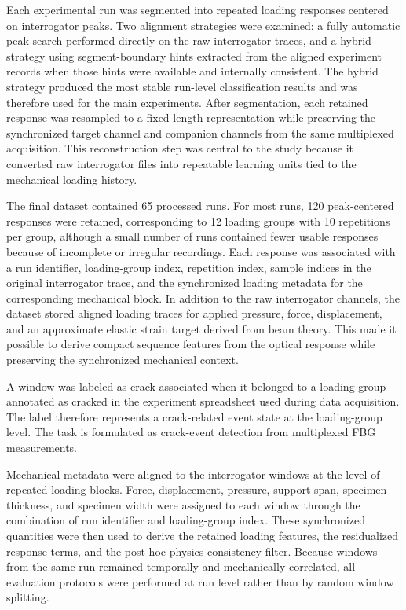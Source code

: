 \documentclass[fleqn,10pt]{wlscirep}
\begin{document}
Each experimental run was segmented into repeated loading responses centered on interrogator peaks. Two alignment strategies were examined: a fully automatic peak search performed directly on the raw interrogator traces, and a hybrid strategy using segment-boundary hints extracted from the aligned experiment records when those hints were available and internally consistent. The hybrid strategy produced the most stable run-level classification results and was therefore used for the main experiments. After segmentation, each retained response was resampled to a fixed-length representation while preserving the synchronized target channel and companion channels from the same multiplexed acquisition. This reconstruction step was central to the study because it converted raw interrogator files into repeatable learning units tied to the mechanical loading history.

The final dataset contained 65 processed runs. For most runs, 120 peak-centered responses were retained, corresponding to 12 loading groups with 10 repetitions per group, although a small number of runs contained fewer usable responses because of incomplete or irregular recordings. Each response was associated with a run identifier, loading-group index, repetition index, sample indices in the original interrogator trace, and the synchronized loading metadata for the corresponding mechanical block. In addition to the raw interrogator channels, the dataset stored aligned loading traces for applied pressure, force, displacement, and an approximate elastic strain target derived from beam theory. This made it possible to derive compact sequence features from the optical response while preserving the synchronized mechanical context.

A window was labeled as crack-associated when it belonged to a loading group annotated as cracked in the experiment spreadsheet used during data acquisition. The label therefore represents a crack-related event state at the loading-group level. The task is formulated as crack-event detection from multiplexed FBG measurements.

Mechanical metadata were aligned to the interrogator windows at the level of repeated loading blocks. Force, displacement, pressure, support span, specimen thickness, and specimen width were assigned to each window through the combination of run identifier and loading-group index. These synchronized quantities were then used to derive the retained loading features, the residualized response terms, and the post hoc physics-consistency filter. Because windows from the same run remained temporally and mechanically correlated, all evaluation protocols were performed at run level rather than by random window splitting.
\end{document}
